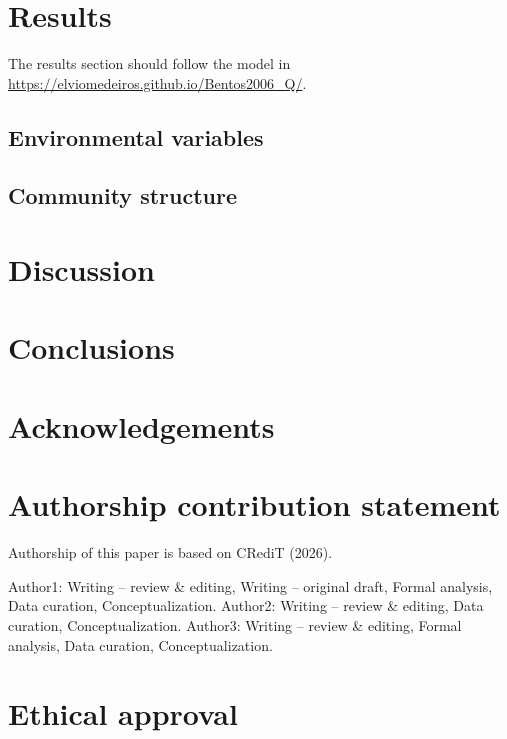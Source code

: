 \documentclass[
  american,
  letterpaper,
  DIV=11,
  numbers=noendperiod]{scrartcl}
\begin{document}
\section{Results}\label{results}

The results section should follow the model in
\url{https://elviomedeiros.github.io/Bentos2006_Q/}.

\subsection{Environmental variables}\label{environmental-variables}

\subsection{Community structure}\label{community-structure}

\section{Discussion}\label{discussion}

\section*{Conclusions}\label{conclusions}

\section*{Acknowledgements}\label{acknowledgements}

\section*{Authorship contribution
statement}\label{authorship-contribution-statement}

Authorship of this paper is based on CRediT (2026).

Author1: Writing -- review \& editing, Writing -- original draft, Formal
analysis, Data curation, Conceptualization. Author2: Writing -- review
\& editing, Data curation, Conceptualization. Author3: Writing -- review
\& editing, Formal analysis, Data curation, Conceptualization.

\section*{Ethical approval}\label{ethical-approval}
\end{document}
